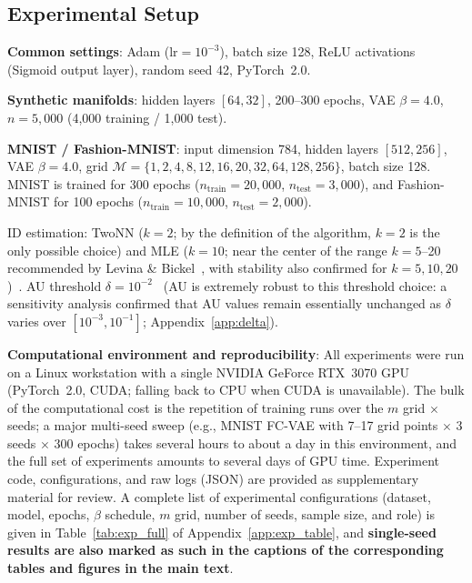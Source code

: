 \documentclass[make,article,submit,pdftex,moreauthors]{Definitions/mdpi}
\begin{document}
\subsection{Experimental Setup}\label{sec:exp_setup}

\textbf{Common settings}: Adam ($\mathrm{lr} = 10^{-3}$), batch size 128, ReLU activations (Sigmoid output layer), random seed 42, PyTorch~2.0.

\textbf{Synthetic manifolds}: hidden layers $[64, 32]$, 200--300 epochs, VAE $\beta = 4.0$, $n = 5{,}000$ (4,000 training / 1,000 test).

\textbf{MNIST / Fashion-MNIST}: input dimension 784, hidden layers $[512, 256]$, VAE $\beta = 4.0$,
grid $\mathcal{M} = \{1,2,4,8,12,16,20,32,64,128,256\}$, batch size 128.
MNIST is trained for 300 epochs ($n_{\mathrm{train}} = 20{,}000$, $n_{\mathrm{test}} = 3{,}000$),
and Fashion-MNIST for 100 epochs ($n_{\mathrm{train}} = 10{,}000$, $n_{\mathrm{test}} = 2{,}000$).

ID estimation: TwoNN ($k=2$; by the definition of the algorithm, $k=2$ is the only possible choice) and MLE ($k=10$; near the center of the range $k=5$--20 recommended by Levina \& Bickel~\cite{levina2005mle}, with stability also confirmed for $k=5,10,20$)~\cite{facco2017twonn,levina2005mle}.
AU threshold $\delta = 10^{-2}$~\cite{lucas2019elbo} (AU is extremely robust to this threshold choice: a sensitivity analysis confirmed that AU values remain essentially unchanged as $\delta$ varies over $[10^{-3}, 10^{-1}]$; Appendix~\ref{app:delta}).

\textbf{Computational environment and reproducibility}:
All experiments were run on a Linux workstation with a single NVIDIA GeForce
RTX~3070 GPU (PyTorch~2.0, CUDA; falling back to CPU when CUDA is unavailable).
The bulk of the computational cost is the repetition of training runs over the
$m$ grid $\times$ seeds; a major multi-seed sweep (e.g., MNIST FC-VAE with 7--17
grid points $\times$ 3 seeds $\times$ 300 epochs) takes several hours to about a
day in this environment, and the full set of experiments amounts to several days
of GPU time.
Experiment code, configurations, and raw logs (JSON) are provided as
supplementary material for review.
A complete list of experimental configurations (dataset, model, epochs, $\beta$
schedule, $m$ grid, number of seeds, sample size, and role) is given in
Table~\ref{tab:exp_full} of Appendix~\ref{app:exp_table}, and
\textbf{single-seed results are also marked as such in the captions of the
corresponding tables and figures in the main text}.
\end{document}
